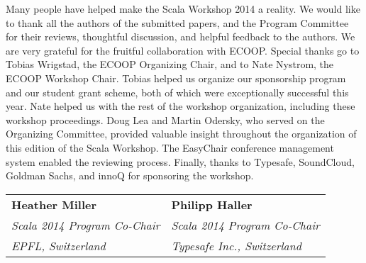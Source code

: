 \documentclass[10pt]{book}
\begin{document}
\noindent
Many people have helped make the Scala Workshop 2014 a reality. We would like
to thank all the authors of the submitted papers, and the Program Committee
for their reviews, thoughtful discussion, and helpful feedback to the authors.
We are very grateful for the fruitful collaboration with ECOOP. Special thanks
go to Tobias Wrigstad, the ECOOP Organizing Chair, and to Nate Nystrom, the
ECOOP Workshop Chair. Tobias helped us organize our sponsorship program and
our student grant scheme, both of which were exceptionally successful this
year. Nate helped us with the rest of the workshop organization, including
these workshop proceedings. Doug Lea and Martin Odersky, who served on the
Organizing Committee, provided valuable insight throughout the organization
of this edition of the Scala Workshop. The EasyChair conference management system
enabled the reviewing  process. Finally, thanks to Typesafe, SoundCloud, Goldman
Sachs, and innoQ for sponsoring the workshop.
\\

\begin{tabular}{ll}
{\bf Heather Miller}              & {\bf Philipp Haller}\\
{\em Scala 2014 Program Co-Chair} & {\em Scala 2014 Program Co-Chair}\\
{\em EPFL, Switzerland}           & {\em Typesafe Inc., Switzerland}\\
\end{tabular}
\end{document}
